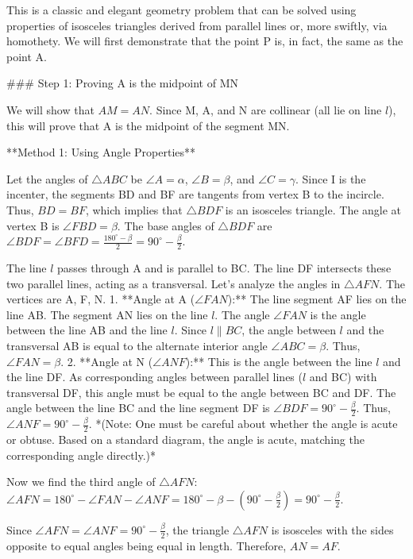This is a classic and elegant geometry problem that can be solved using properties of isosceles triangles derived from parallel lines or, more swiftly, via homothety. We will first demonstrate that the point P is, in fact, the same as the point A.

### Step 1: Proving A is the midpoint of MN

We will show that $AM = AN$. Since M, A, and N are collinear (all lie on line $l$), this will prove that A is the midpoint of the segment MN.

**Method 1: Using Angle Properties**

Let the angles of $\triangle ABC$ be $\angle A = \alpha$, $\angle B = \beta$, and $\angle C = \gamma$.
Since I is the incenter, the segments BD and BF are tangents from vertex B to the incircle. Thus, $BD = BF$, which implies that $\triangle BDF$ is an isosceles triangle.
The angle at vertex B is $\angle FBD = \beta$. The base angles of $\triangle BDF$ are $\angle BDF = \angle BFD = \frac{180^\circ - \beta}{2} = 90^\circ - \frac{\beta}{2}$.

The line $l$ passes through A and is parallel to BC. The line DF intersects these two parallel lines, acting as a transversal.
Let's analyze the angles in $\triangle AFN$. The vertices are A, F, N.
1.  **Angle at A ($\angle FAN$):** The line segment AF lies on the line AB. The segment AN lies on the line $l$. The angle $\angle FAN$ is the angle between the line AB and the line $l$. Since $l \parallel BC$, the angle between $l$ and the transversal AB is equal to the alternate interior angle $\angle ABC = \beta$. Thus, $\angle FAN = \beta$.
2.  **Angle at N ($\angle ANF$):** This is the angle between the line $l$ and the line DF. As corresponding angles between parallel lines ($l$ and BC) with transversal DF, this angle must be equal to the angle between BC and DF. The angle between the line BC and the line segment DF is $\angle BDF = 90^\circ - \frac{\beta}{2}$. Thus, $\angle ANF = 90^\circ - \frac{\beta}{2}$.
    *(Note: One must be careful about whether the angle is acute or obtuse. Based on a standard diagram, the angle is acute, matching the corresponding angle directly.)*

Now we find the third angle of $\triangle AFN$:
$\angle AFN = 180^\circ - \angle FAN - \angle ANF = 180^\circ - \beta - (90^\circ - \frac{\beta}{2}) = 90^\circ - \frac{\beta}{2}$.

Since $\angle AFN = \angle ANF = 90^\circ - \frac{\beta}{2}$, the triangle $\triangle AFN$ is isosceles with the sides opposite to equal angles being equal in length.
Therefore, $AN = AF$.

